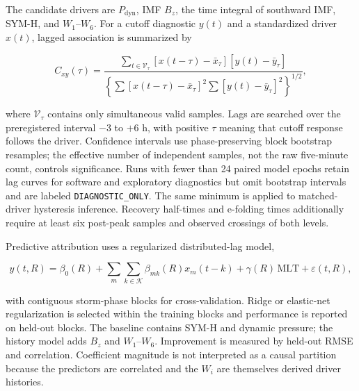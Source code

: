 The candidate drivers are $P_{\mathrm{dyn}}$, IMF $B_z$, the time integral of
southward IMF, SYM-H, and $W_1$--$W_6$. For a cutoff diagnostic $y(t)$ and a
standardized driver $x(t)$, lagged association is summarized by
\begin{linenomath*}
\begin{equation}
 C_{xy}(\tau)=
 \frac{\sum_{t\in\mathcal{V}_{\tau}}[x(t-\tau)-\bar{x}_{\tau}]
 [y(t)-\bar{y}_{\tau}]}
 {\left\{\sum[x(t-\tau)-\bar{x}_{\tau}]^2
 \sum[y(t)-\bar{y}_{\tau}]^2\right\}^{1/2}},
 \label{eq:exp-lag-correlation}
\end{equation}
\end{linenomath*}
where $\mathcal{V}_{\tau}$ contains only simultaneous valid samples. Lags are
searched over the preregistered interval $-3$ to $+6$ h, with positive $\tau$
meaning that cutoff response follows the driver. Confidence intervals use
phase-preserving block bootstrap resamples; the effective number of
independent samples, not the raw five-minute count, controls significance.
Runs with fewer than 24 paired model epochs retain lag curves for software and
exploratory diagnostics but omit bootstrap intervals and are labeled
\texttt{DIAGNOSTIC\_ONLY}. The same minimum is applied to matched-driver
hysteresis inference. Recovery half-times and e-folding times additionally
require at least six post-peak samples and observed crossings of both levels.

Predictive attribution uses a regularized distributed-lag model,
\begin{linenomath*}
\begin{equation}
 y(t,R)=\beta_0(R)+\sum_m\sum_{k\in\mathcal{K}}
 \beta_{mk}(R)x_m(t-k)+\gamma(R)\,\mathrm{MLT}+\varepsilon(t,R),
 \label{eq:exp-distributed-lag}
\end{equation}
\end{linenomath*}
with contiguous storm-phase blocks for cross-validation. Ridge or elastic-net
regularization is selected within the training blocks and performance is
reported on held-out blocks. The baseline contains SYM-H and dynamic pressure;
the history model adds $B_z$ and $W_1$--$W_6$. Improvement is measured by
held-out RMSE and correlation. Coefficient magnitude is not interpreted as a
causal partition because the predictors are correlated and the $W_i$ are
themselves derived driver histories.

